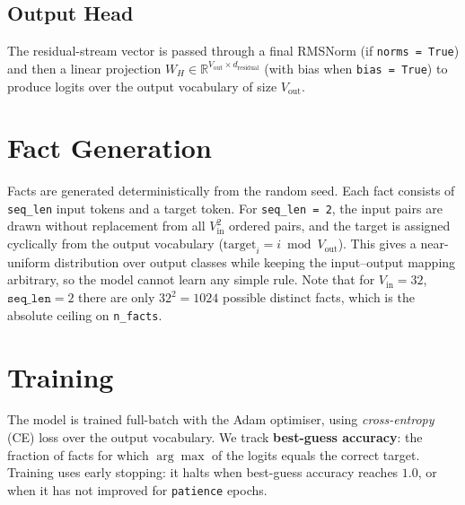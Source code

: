 \documentclass[11pt,a4paper]{article}
\begin{document}
\subsection{Output Head}

The residual-stream vector is passed through a final RMSNorm (if \texttt{norms = True}) and then a linear projection $W_H \in \mathbb{R}^{V_\text{out} \times d_\text{residual}}$ (with bias when \texttt{bias = True}) to produce logits over the output vocabulary of size $V_\text{out}$.

\section{Fact Generation}

Facts are generated deterministically from the random seed. Each fact consists of \texttt{seq\_len} input tokens and a target token. For \texttt{seq\_len = 2}, the input pairs are drawn without replacement from all $V_\text{in}^2$ ordered pairs, and the target is assigned cyclically from the output vocabulary ($\text{target}_i = i \bmod V_\text{out}$). This gives a near-uniform distribution over output classes while keeping the input--output mapping arbitrary, so the model cannot learn any simple rule. Note that for $V_\text{in} = 32$, $\texttt{seq\_len} = 2$ there are only $32^2 = 1024$ possible distinct facts, which is the absolute ceiling on \texttt{n\_facts}.

\section{Training}

The model is trained full-batch with the Adam optimiser, using \emph{cross-entropy} (CE) loss over the output vocabulary. We track \textbf{best-guess accuracy}: the fraction of facts for which $\arg\max$ of the logits equals the correct target. Training uses early stopping: it halts when best-guess accuracy reaches $1.0$, or when it has not improved for \texttt{patience} epochs.
\end{document}
